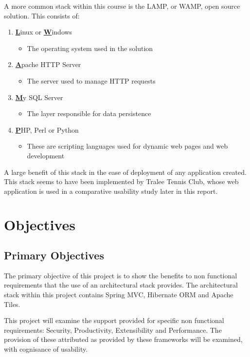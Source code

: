 A more common stack within this course is the LAMP, or WAMP, open source solution. This consists of: 

\begin{enumerate}
\item \underline{\textbf{L}}inux or \underline{\textbf{W}}indows
\begin{itemize}
\item The operating system used in the solution
\end{itemize}
\item \underline{\textbf{A}}pache HTTP Server
\begin{itemize}
\item The server used to manage HTTP requests
\end{itemize}
\item \underline{\textbf{M}}y SQL Server
\begin{itemize}
\item The layer responsible for data persistence
\end{itemize}
\item \underline{\textbf{P}}HP, Perl or Python
\begin{itemize}
\item These are scripting languages used for dynamic web pages and web development
\end{itemize}
\end{enumerate}

A large benefit of this stack in the ease of deployment of any application created. This stack seems to have been implemented by Tralee Tennis Club, whose web application is used in a comparative usability study later in this report.

\section{Objectives}

\subsection{Primary Objectives}

The primary objective of this project is to show the benefits to non functional requirements that the use of an architectural stack provides. The architectural stack within this project contains Spring MVC, Hibernate ORM and Apache Tiles. 

This project will examine the support provided for specific non functional requirements: Security, Productivity, Extensibility and Performance. The provision of these attributed as provided by these frameworks will be examined, with cognisance of usability. 

